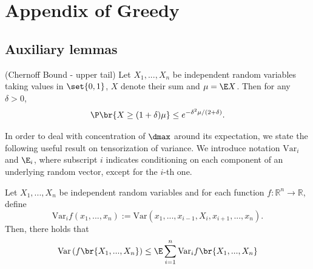 \chapter{Appendix of Greedy}
\section{Auxiliary lemmas}\label{appendix:aux_lemmas}
%
\begin{lemma}\label{lemma:chernoff}(Chernoff Bound - upper tail)
Let $X_1, ..., X_n$ be independent random variables taking values in $\set{0, 1}$, $X$ denote their sum and $\mu = \E X$. Then for any $\delta > 0$,
    \begin{align*}
        \P\br{X \geq (1+\delta)\mu}\leq e^{-\delta^2 \mu / (2+\delta)}.
    \end{align*}
\end{lemma}


\noindent
In order to deal with concentration of $\dmax$ around its expectation, we state the following useful result on tensorization of variance. We introduce notation \(\text{Var}_i\) and \(\E_i\), where subscript $i$ indicates conditioning on each component of an underlying random vector, except for the $i$-th one.
\begin{lemma}\label{lemma:tensorization_var}
Let $X_1,...,X_n$ be independent random variables and for each function $f:\mathbb{R}^n \rightarrow \mathbb{R}$, define 
\[\text{Var}_i f(x_1,...,x_n) := \text{Var}\left(x_1,...,x_{i-1},X_i,x_{i+1},...,x_n\right).\]
Then, there holds that 
\[\text{Var} \left(f\br{X_1,...,X_n}\right ) \leq \E \sum_{i = 1}^n \text{Var}_i f\br{X_1,...,X_n}\]
\end{lemma}


